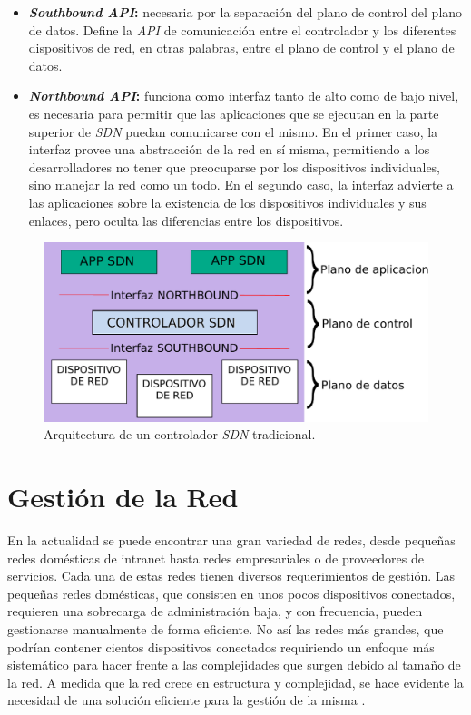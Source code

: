 \begin{itemize}
	\item \textbf{\textit{Southbound API}:} necesaria por la separación del plano de control del plano de datos. Define la \textit{API} de comunicación entre el controlador y los diferentes dispositivos de red, en otras palabras, entre el plano de control y el plano de datos.  
	\item \textbf{\textit{Northbound API}:} funciona como interfaz tanto de alto como de bajo nivel, es necesaria para permitir que las aplicaciones que se ejecutan en la parte superior de \textit{SDN} puedan comunicarse con el mismo. En el primer caso, la interfaz provee una abstracción de la red en sí misma, permitiendo a los desarrolladores no tener que preocuparse por los dispositivos individuales, sino manejar la red como un todo. En el segundo caso, la interfaz advierte a las aplicaciones sobre la existencia de los dispositivos individuales y sus enlaces, pero oculta las diferencias entre los dispositivos. 
\end{itemize}


\begin{figure}[htbp]
	\centering
	\includegraphics[scale=0.6]{Figures/arquitectura-controlador.pdf}
	\caption{Arquitectura de un controlador \textit{SDN} tradicional.}
	\label{fig:arquitectura_sdn}
  \end{figure}

\section{Gestión de la Red} \label{sec:gestionred}
En la actualidad se puede encontrar una gran variedad de redes, desde pequeñas redes domésticas de intranet hasta redes empresariales o de proveedores de servicios. Cada una de estas redes tienen diversos requerimientos de gestión.  Las pequeñas redes domésticas, que consisten en unos pocos dispositivos conectados, requieren una sobrecarga de administración baja, y con frecuencia, pueden gestionarse manualmente de forma eficiente. No así las redes más grandes, que podrían contener cientos dispositivos conectados requiriendo un enfoque más sistemático para hacer frente a las complejidades que surgen debido al tamaño de la red. A medida que la red crece en estructura y complejidad, se hace evidente la necesidad de una solución eficiente para la gestión de la misma \parencite{gestionderedes}.

